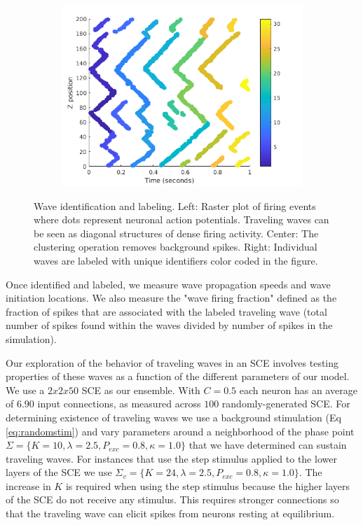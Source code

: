 \documentclass[12pt]{article}
\begin{document}
\begin{figure}[!htb]
\begin{subfigure}{0.33\textwidth}
  \includegraphics[width=\textwidth]{fig/2x2_wave_IDs}
 \end{subfigure}%
 \caption{Wave identification and labeling. Left: Raster plot of firing events where dots represent neuronal action potentials. 
          Traveling waves can be seen as diagonal structures of dense firing activity. 
          Center: The clustering operation removes background spikes. 
          Right: Individual waves are labeled with unique identifiers color coded in the figure.}
 \label{fig:wave_analysis}
\end{figure}

Once identified and labeled, we measure wave propagation speeds and wave initiation locations. 
We also measure the "wave firing fraction" defined as the fraction of spikes that are associated with the labeled traveling wave (total number of spikes found within the waves divided by number of spikes in the simulation). 

Our exploration of the behavior of traveling waves in an SCE involves testing properties of these waves as a function of the different parameters of our model.
We use a $2x2x50$ SCE as our ensemble.
With $C=0.5$ each neuron has an average of $6.90$ input connections, as measured across $100$ randomly-generated SCE. 
For determining existence of traveling waves we use a background stimulation (Eq \ref{eq:randomstim}) and vary parameters around a neighborhood of the phase point $\Sigma = \{K=10,\lambda=2.5,P_{exc}=0.8,\kappa=1.0 \}$ that we have determined can sustain traveling waves.
For instances that use the step stimulus applied to the lower layers of the SCE we use $\Sigma_v = \{K=24,\lambda=2.5,P_{exc}=0.8,\kappa=1.0 \}$.
The increase in $K$ is required when using the step stimulus because the higher layers of the SCE do not receive any stimulus.
This requires stronger connections so that the traveling wave can elicit spikes from neurons resting at equilibrium.
\FloatBarrier
\end{document}
